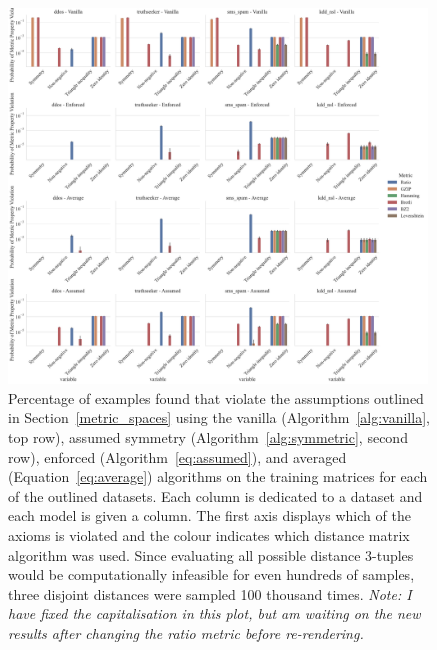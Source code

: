 \documentclass[preprint,12pt]{article}
\newcommand{\cm}[1]{\textit{{\color{blue}#1}}}
\begin{document}
\begin{figure}[h!]
    \centering
    \includegraphics[width=0.99\textwidth]{images/read_world_check.pdf}
    \caption{Percentage of examples found that violate the assumptions outlined in Section~\ref{metric_spaces} using the vanilla (Algorithm~\ref{alg:vanilla}, top row), assumed symmetry (Algorithm~\ref{alg:symmetric}, second row), enforced (Algorithm~\ref{eq:assumed}), and averaged (Equation~\ref{eq:average}) algorithms on the training matrices for each of the outlined datasets. Each column is dedicated to a dataset and each model is given a column. The first axis displays which of the axioms is violated and the colour indicates which distance matrix algorithm was used. Since evaluating all possible distance 3-tuples would be computationally infeasible for even hundreds of samples, three disjoint distances were sampled  100 thousand times. \cm{Note: I have fixed the capitalisation in this plot, but am waiting on the new results after changing the ratio metric before re-rendering.}}
    \label{fig:real_world_check}
\end{figure}
\end{document}
